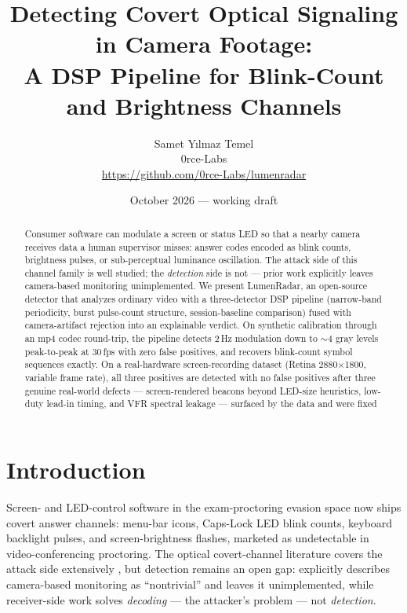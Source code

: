 \documentclass[10pt]{article}
\title{Detecting Covert Optical Signaling in Camera Footage:\\
A DSP Pipeline for Blink-Count and Brightness Channels}
\author{Samet Y{\i}lmaz Temel\\
0rce-Labs\\
\url{https://github.com/0rce-Labs/lumenradar}}
\date{October 2026 --- working draft}
\begin{document}
\maketitle

\begin{abstract}
Consumer software can modulate a screen or status LED so that a nearby camera
receives data a human supervisor misses: answer codes encoded as blink counts,
brightness pulses, or sub-perceptual luminance oscillation. The attack side of
this channel family is well studied; the \emph{detection} side is not --- prior
work explicitly leaves camera-based monitoring unimplemented. We present
LumenRadar, an open-source detector that analyzes ordinary video with a
three-detector DSP pipeline (narrow-band periodicity, burst pulse-count
structure, session-baseline comparison) fused with camera-artifact rejection
into an explainable verdict. On synthetic calibration through an mp4 codec
round-trip, the pipeline detects 2\,Hz modulation down to
$\sim$4 gray levels peak-to-peak at 30\,fps with zero false positives, and
recovers blink-count symbol sequences exactly. On a real-hardware screen-recording
dataset (Retina 2880$\times$1800, variable frame rate), all three positives are
detected with no false positives after three genuine real-world defects ---
screen-rendered beacons beyond LED-size heuristics, low-duty lead-in timing,
and VFR spectral leakage --- surfaced by the data and were fixed
\end{abstract}

\section{Introduction}
Screen- and LED-control software in the exam-proctoring evasion space now ships
covert answer channels: menu-bar icons, Caps-Lock LED blink counts, keyboard
backlight pulses, and screen-brightness flashes, marketed as undetectable in
video-conferencing proctoring. The optical covert-channel literature covers the
attack side extensively
\cite{leditgo2017,brightness2020,visisploit2016,hilight2016,receiver2023}, but
detection remains an open gap: \cite{brightness2020} explicitly describes
camera-based monitoring as ``nontrivial'' and leaves it unimplemented, while
receiver-side work solves \emph{decoding} --- the attacker's problem ---
not \emph{detection}.
\end{document}
